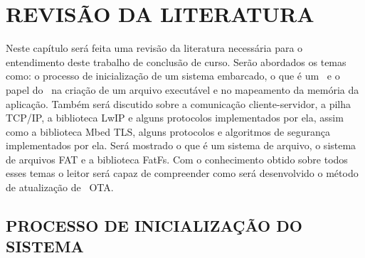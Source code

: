 
\chapter{REVISÃO DA LITERATURA}
\label{chap:fundamentacaoTeorica}
Neste capítulo será feita uma revisão da literatura necessária para o entendimento deste trabalho de conclusão de curso. 
Serão abordados os temas como: o processo de inicialização de um sistema embarcado, o que é um \bootloader\ e o papel do \linker\ na criação de um arquivo executável e no mapeamento da memória da aplicação.
Também será discutido sobre  a comunicação cliente-servidor, a pilha TCP/IP, a biblioteca LwIP e alguns protocolos implementados por ela, assim como a biblioteca Mbed TLS, alguns protocolos e algoritmos de segurança implementados por ela.
Será mostrado o que é um sistema de arquivo, o sistema de arquivos FAT e a biblioteca FatFs.
Com o conhecimento obtido sobre todos esses temas o leitor será capaz de compreender como será desenvolvido o método de atualização de \firmware\ OTA.


\section{PROCESSO DE INICIALIZAÇÃO DO SISTEMA}


